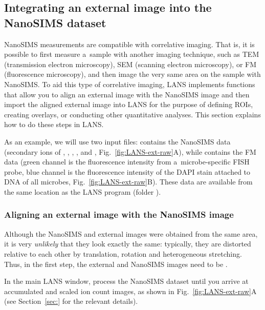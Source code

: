 \subsection{Integrating an external image into the NanoSIMS dataset}
\setcounter{step}{0}

\goldbox{}
NanoSIMS measurements are compatible with correlative imaging. That is, it is possible to first measure a~sample with another imaging technique, such as TEM (transmission electron microscopy), SEM (scanning electron microscopy), or FM (fluorescence microscopy), and then image the very same area on the sample with NanoSIMS. To aid this type of correlative imaging, LANS implements functions that allow you to align an external image with the NanoSIMS image and then import the aligned external image into LANS for the purpose of defining ROIs, creating overlays, or conducting other quantitative analyses. This section explains how to do these steps in LANS.
\tcbe

As an example, we will use two input files:  contains the NanoSIMS data (secondary ions of , , , ,  and , Fig.~\ref{fig:LANS-ext-raw}A), while  contains the FM data (green channel is the fluorescence intensity from a~microbe-specific FISH probe, blue channel is the fluorescence intensity of the DAPI stain attached to DNA of all microbes, Fig.~\ref{fig:LANS-ext-raw}B). These data are available from the same location as the LANS program (folder ).

\subsubsection{Aligning an external image with the NanoSIMS image}
\setcounter{step}{0}

\goldbox{}
Although the NanoSIMS and external images were obtained from the same area, it is very \emph{unlikely} that they look exactly the same: typically, they are distorted relative to each other by translation, rotation and heterogeneous stretching. Thus, in the first step, the external and NanoSIMS images need to be .
\tcbe

\s In the main LANS window, process the NanoSIMS dataset  until you arrive at accumulated and scaled ion count images, as shown in Fig.~\ref{fig:LANS-ext-raw}A (see Section~\ref{sec:} for the relevant details).

